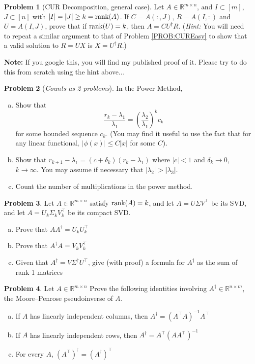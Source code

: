 \documentclass{amsart}[11pt]
\theoremstyle{definition}
\newtheorem{problem}{Problem}
\newcommand{\R}{\mathbb{R}}
\newcommand{\rank}{\textnormal{rank}}
\begin{document}
\begin{problem}[CUR Decomposition, general case]
Let $A\in\R^{m\times n}$, and $I\subset[m]$, $J\subset[n]$ with $|I|=|J|\geq k=\textnormal{rank}(A)$.  If $C=A(:,J)$, $R=A(I,:)$ and $U=A(I,J)$, prove that if $\rank(U)=k$, then $A=CU^{\dagger}R$.  (\textit{Hint:} You will need to repeat a similar argument to that of Problem \ref{PROB:CUREasy} to show that a valid solution to $R = UX$ is $X=U^\dagger R$.)

\textbf{Note:} If you google this, you will find my published proof of it. Please try to do this from scratch using the hint above... 
\end{problem}


\begin{problem}[\textit{Counts as 2 problems}]
In the Power Method, 
\begin{enumerate}[(a)]
\item Show that
\[\frac{r_k-\lambda_1}{\lambda_1} = \left(\frac{\lambda_2}{\lambda_1}\right)^kc_k\]
for some bounded sequence $c_k$. (You may find it useful to use the fact that for any linear functional, $|\phi(x)|\leq C|x|$ for some $C$).
\item Show that $r_{k+1}-\lambda_1 = (c+\delta_k)(r_k-\lambda_1)$ where $|c|<1$ and $\delta_k\to 0$, $k\to\infty$.  You may assume if necessary that $|\lambda_2|>|\lambda_3|$.
\item Count the number of multiplications in the power method.
\end{enumerate}
\end{problem}

\begin{problem}\label{PROB:Pseudoinverse}
Let $A\in\R^{m\times n}$ satisfy $\rank(A)=k$, and let $A=U\Sigma V^{\top}$ be its SVD, and let $A=U_k\Sigma_kV_k^{\top}$ be its compact SVD.	
\begin{enumerate}[(a)]
\item Prove that $AA^\dagger = U_kU_k^{\top}$
\item Prove that $A^\dagger A = V_kV_k^{\top}$
\item Given that $A^\dagger = V\Sigma^\dagger U^{\top}$, give (with proof) a formula for $A^\dagger$ as the sum of rank 1 matrices
\end{enumerate}
\end{problem}

\begin{problem}\label{PROB:Pseudoinverse2}
Let $A\in\R^{m\times n}$ Prove the following identities involving $A^\dagger\in\R^{n\times m}$, the Moore--Penrose pseudoinverse of $A$.	
\begin{enumerate}[(a)]
\item If $A$ has linearly independent columns, then $A^\dagger = (A^\top A)^{-1}A^\top$
\item If $A$ has linearly independent rows, then $A^\dagger = A^\top(AA^\top)^{-1}$
\item For every $A$, $(A^\top)^\dagger = (A^\dagger)^\top$
\end{enumerate}
\end{problem}
\end{document}
